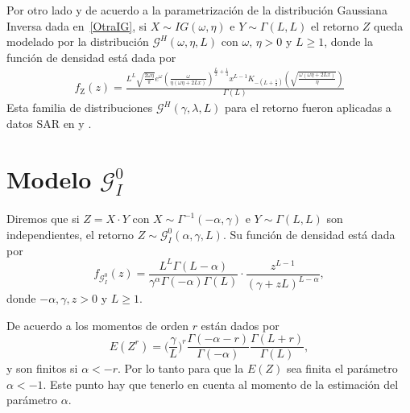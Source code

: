 Por otro lado y de acuerdo a la parametrización de la distribución Gaussiana Inversa dada en~\eqref{OtraIG}, si $X\sim IG(\omega,\eta)$ e $Y \sim \Gamma(L,L)$ el retorno $Z$ queda modelado por la distribución $ \mathcal{G}^H(\omega,\eta,L)$ con $\omega, \, \eta >0$ y $L \geq 1$, donde la función de densidad está dada por 
\begin{align}
\label{ModeloGH}
f_{\text{Z}}( z) =\frac{L^L \sqrt{\frac{2 \omega  \eta }{\pi }} e^{\omega } \left(\frac{\omega }{\eta  (\omega  \eta +2 L
		x)}\right)^{\frac{L}{2}+\frac{1}{4}} x^{L-1} K_{-\left(L+\frac{1}{2}\right)}\left(\sqrt{\frac{\omega 
			(\omega  \eta +2 L x)}{\eta }}\right)}{\Gamma (L)}
\end{align}
Esta familia de distribuciones $\mathcal{G}^H(\gamma,\lambda,L)$ para el retorno fueron aplicadas a datos SAR en \citet{Buemi2009} y \citet{Jacobo2005}.


\section{Modelo $\mathcal{G}_I^0$}
\label{ModeloGI0}

Diremos que si $Z=X \cdot Y$ con $X \sim \Gamma^{-1}(-\alpha,\gamma)$ e $Y \sim \Gamma(L,L)$ son independientes, el retorno $Z \sim \mathcal{G}_I^0(\alpha,\gamma,L)$. 
Su función de densidad está dada por 
\begin{equation}
f_{\mathcal{G}_I^{0}}( z) =\frac{L^{L}\Gamma ( L-\alpha
	) }{\gamma ^{\alpha }\Gamma ( -\alpha ) \Gamma (
	L) }\cdot  
\frac{z^{L-1}}{( \gamma +zL) ^{L-\alpha }},%
\label{ec_dens_gI0}
\end{equation}
donde $-\alpha,\gamma ,z>0$ y $L\geq 1$.

De acuerdo a \citet{gambini2015} los momentos de orden $r$ están dados por
\begin{equation}
E(Z^r) =\Big(\frac{\gamma}{L}\Big)^r\frac{\Gamma ( -\alpha-r )}{ \Gamma (-\alpha) }
\frac{\Gamma (L+r )}{\Gamma (L)},
\label{moments_gI0}
\end{equation}
y son finitos si $\alpha<-r$. Por lo tanto para que la $E(Z)$ sea finita el parámetro $\alpha<-1$. Este punto hay que tenerlo en cuenta al momento de la estimación del parámetro $\alpha$.

